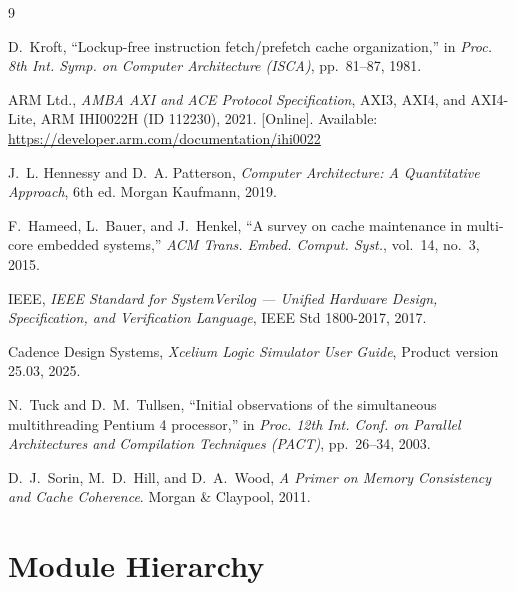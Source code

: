 \documentclass[12pt,letterpaper]{report}
\begin{document}
\begin{thebibliography}{9}

D.~Kroft,
``Lockup-free instruction fetch/prefetch cache organization,''
in \textit{Proc. 8th Int. Symp. on Computer Architecture (ISCA)},
pp.~81--87, 1981.

ARM Ltd.,
\textit{AMBA AXI and ACE Protocol Specification}, AXI3, AXI4, and AXI4-Lite,
ARM IHI0022H (ID 112230), 2021.
[Online]. Available: \url{https://developer.arm.com/documentation/ihi0022}

J.~L. Hennessy and D.~A. Patterson,
\textit{Computer Architecture: A Quantitative Approach}, 6th ed.
Morgan Kaufmann, 2019.

F.~Hameed, L.~Bauer, and J.~Henkel,
``A survey on cache maintenance in multi-core embedded systems,''
\textit{ACM Trans. Embed. Comput. Syst.}, vol.~14, no.~3, 2015.

IEEE,
\textit{IEEE Standard for SystemVerilog --- Unified Hardware Design,
Specification, and Verification Language}, IEEE Std 1800-2017, 2017.

Cadence Design Systems,
\textit{Xcelium Logic Simulator User Guide},
Product version 25.03, 2025.

N.~Tuck and D.~M.~Tullsen,
``Initial observations of the simultaneous multithreading Pentium 4 processor,''
in \textit{Proc. 12th Int. Conf. on Parallel Architectures and Compilation
Techniques (PACT)}, pp.~26--34, 2003.

D.~J.~Sorin, M.~D.~Hill, and D.~A.~Wood,
\textit{A Primer on Memory Consistency and Cache Coherence}.
Morgan \& Claypool, 2011.

\end{thebibliography}

\appendix

\chapter{Module Hierarchy}
\label{app:hier}
\end{document}
